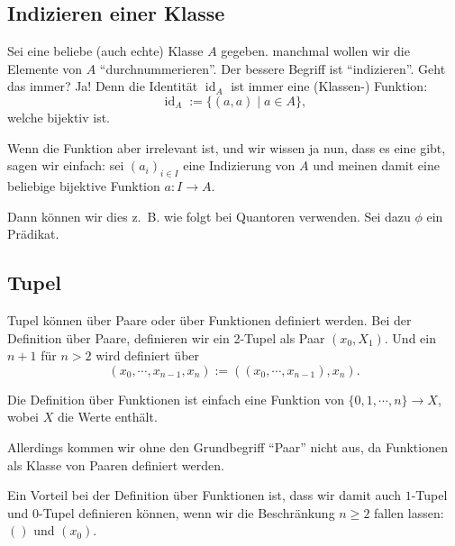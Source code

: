 \documentclass[a4paper]{amsart}
\theoremstyle{definition}
\DeclareMathOperator{\id}{id}
\newcommand{\zb}{z.~B. }
\begin{document}
\subsection{Indizieren einer Klasse}
Sei eine beliebe (auch echte) Klasse $A$ gegeben. manchmal wollen wir die Elemente von $A$ "`durchnummerieren"'. Der bessere Begriff ist "`indizieren"'. Geht das immer? Ja! Denn die Identität $\id_A$ ist immer eine (Klassen-) Funktion:
\begin{equation}
    \id_A := \{(a,a) \mid a \in A\},
\end{equation}
welche bijektiv ist.

Wenn die Funktion aber irrelevant ist, und wir wissen ja nun, dass es eine gibt, sagen wir einfach: sei $(a_i)_{i \in I}$ eine Indizierung von $A$ und meinen damit eine beliebige bijektive Funktion $a \colon I \to A$.

Dann können wir dies \zb wie folgt bei Quantoren verwenden. Sei dazu $\phi$ ein Prädikat.

\subsection{Tupel}
Tupel können über Paare oder über Funktionen definiert werden. Bei der Definition über Paare, definieren wir ein 2-Tupel als Paar $(x_0, X_1)$. Und ein $n+1$ für $n>2$ wird definiert über
\begin{equation}
    (x_0, \cdots, x_{n-1}, x_n) := ((x_0, \cdots, x_{n-1}), x_n).
\end{equation}

Die Definition über Funktionen ist einfach eine Funktion von $\{0, 1, \cdots, n\} \to X$, wobei $X$ die Werte enthält.

Allerdings kommen wir ohne den Grundbegriff "`Paar"' nicht aus, da Funktionen als Klasse von Paaren definiert werden.

Ein Vorteil bei der Definition über Funktionen ist, dass wir damit auch $1$-Tupel und $0$-Tupel definieren können, wenn wir die Beschränkung $n \ge 2$ fallen lassen: $()$ und $(x_0)$.

\end{document}
